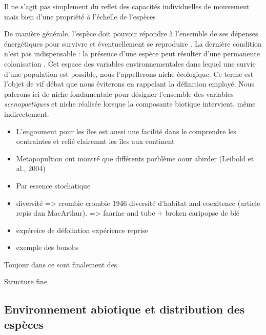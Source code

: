 Il ne s'agit pas simplement du reflet des capacités individuelles de
mouvement mais bien d'une propriété à l'échelle de l'espèces

De manière générale, l'espèce doit pouvoir répondre à l'ensemble de ses
dépenses énergétiques pour survivre et éventuellement se reproduire
\cite{Holt2009a}. La dernière condition n'est pas indispensable : la
présence d'une espèce peut résulter d'une permanente colonisation
\cite{Leibold2004}. Cet espace des variables environnementales dans
lequel une survie d'une population est possible, nous l'appellerons
niche écologique. Ce terme est l'objet de vif débat \cite{Chase2003} que
nous éviterons en rappelant la définition employé. Nous palerons ici de
niche fondamentale pour désigner l'ensemble des variables
\textit{scenopoetiques} et niche réalisée lorsque la composante biotique
intervient, même indirectement.

\begin{itemize}
\item
  L'engoument pour les îles est aussi une facilité dans le comprendre
  les ocntraintes et relié clairemnt les îles aux continent
\item
  Metapopultion ont montré que différents porblème oour abirder (Leibold
  et al., 2004)
\item
  Par essence stochatique
\item
  diversité =\textgreater{} crombie crombie 1946 diversité d'habitat and
  coexitence (article repis dan MacArthur). =\textgreater{} faarine and
  tube + broken caripopse de blé
\item
  expéreice de défoliation expérience reprise
\item
  exemple des bonobs
\end{itemize}

Toujour dans ce sont finalement des

Structure fine

\subsection*{Environnement abiotique et distribution des
espèces}\label{environnement-abiotique-et-distribution-des-espuxe8ces}

